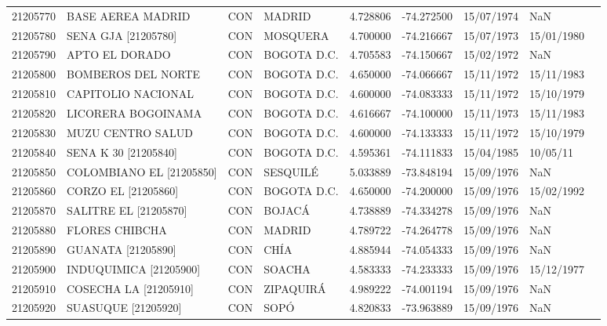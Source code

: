 \begin{landscape}
\begin{longtable}{lp{4cm}lp{3cm}lrrll}
   21205770 &           BASE AEREA MADRID &  CON &            MADRID &  4.728806 & -74.272500 &  15/07/1974 &         NaN \\
   21205780 &         SENA GJA [21205780] &  CON &          MOSQUERA &  4.700000 & -74.216667 &  15/07/1973 &  15/01/1980 \\
   21205790 &              APTO EL DORADO &  CON &       BOGOTA D.C. &  4.705583 & -74.150667 &  15/02/1972 &         NaN \\
   21205800 &          BOMBEROS DEL NORTE &  CON &       BOGOTA D.C. &  4.650000 & -74.066667 &  15/11/1972 &  15/11/1983 \\
   21205810 &          CAPITOLIO NACIONAL &  CON &       BOGOTA D.C. &  4.600000 & -74.083333 &  15/11/1972 &  15/10/1979 \\
   21205820 &          LICORERA BOGOINAMA &  CON &       BOGOTA D.C. &  4.616667 & -74.100000 &  15/11/1973 &  15/11/1983 \\
   21205830 &           MUZU CENTRO SALUD &  CON &       BOGOTA D.C. &  4.600000 & -74.133333 &  15/11/1972 &  15/10/1979 \\
   21205840 &        SENA K 30 [21205840] &  CON &       BOGOTA D.C. &  4.595361 & -74.111833 &  15/04/1985 &    10/05/11 \\
   21205850 &    COLOMBIANO EL [21205850] &  CON &          SESQUILÉ &  5.033889 & -73.848194 &  15/09/1976 &         NaN \\
   21205860 &         CORZO EL [21205860] &  CON &       BOGOTA D.C. &  4.650000 & -74.200000 &  15/09/1976 &  15/02/1992 \\
   21205870 &       SALITRE EL [21205870] &  CON &            BOJACÁ &  4.738889 & -74.334278 &  15/09/1976 &         NaN \\
   21205880 &              FLORES CHIBCHA &  CON &            MADRID &  4.789722 & -74.264778 &  15/09/1976 &         NaN \\
   21205890 &          GUANATA [21205890] &  CON &              CHÍA &  4.885944 & -74.054333 &  15/09/1976 &         NaN \\
   21205900 &      INDUQUIMICA [21205900] &  CON &            SOACHA &  4.583333 & -74.233333 &  15/09/1976 &  15/12/1977 \\
   21205910 &       COSECHA LA [21205910] &  CON &         ZIPAQUIRÁ &  4.989222 & -74.001194 &  15/09/1976 &         NaN \\
   21205920 &      SUASUQUE    [21205920] &  CON &              SOPÓ &  4.820833 & -73.963889 &  15/09/1976 &         NaN \\

\end{longtable}
\end{landscape}
